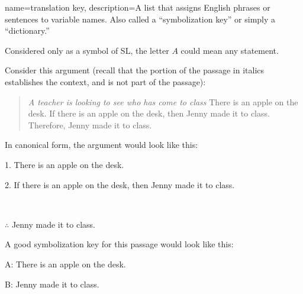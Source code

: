 {
name=translation key,
description={A list that assigns English phrases or sentences to variable names. Also called a ``symbolization key''  or simply a ``dictionary.''}
}

Considered only as a symbol of SL, the letter $A$ could mean any statement. 

Consider this argument (recall that the portion of the passage in italics establishes the context, and is not part of the passage):

\begin{quotation}
\noindent \textit{A teacher is looking to see who has come to class} There is an apple on the desk. If there is an apple on the desk, then Jenny made it to class. Therefore, Jenny made it to class.
\end{quotation}

In canonical form, the argument would look like this:

\begin{earg}
\item[1.] There is an apple on the desk.
\item[2.] If there is an apple on the desk, then Jenny made it to class.
\item[] \textcolor{white}{.}\sout{\hspace{.8\linewidth}}\textcolor{white}{.}
\item[$\therefore$] Jenny made it to class.
\end{earg}

A good symbolization key for this passage would look like this:

\begin{ekey}
\item[A:]There is an apple on the desk.
\item[B:]Jenny made it to class.
\end{ekey}

